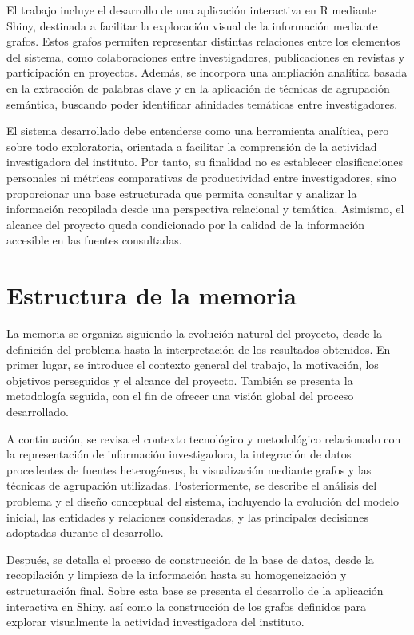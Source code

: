 \documentclass[11pt,spanish,listoffigures,listoftables]{tfgetsinf}
\begin{document}
El trabajo incluye el desarrollo de una aplicación interactiva en R mediante Shiny, destinada a facilitar la exploración visual de la información mediante grafos. Estos grafos permiten representar distintas relaciones entre los elementos del sistema, como colaboraciones entre investigadores, publicaciones en revistas y participación en proyectos. Además, se incorpora una ampliación analítica basada en la extracción de palabras clave y en la aplicación de técnicas de agrupación semántica, buscando poder identificar afinidades temáticas entre investigadores.

El sistema desarrollado debe entenderse como una herramienta analítica, pero sobre todo exploratoria, orientada a facilitar la comprensión de la actividad investigadora del instituto. Por tanto, su finalidad no es establecer clasificaciones personales ni métricas comparativas de productividad entre investigadores, sino proporcionar una base estructurada que permita consultar y analizar la información recopilada desde una perspectiva relacional y temática. Asimismo, el alcance del proyecto queda condicionado por la calidad de la información accesible en las fuentes consultadas.

\section{Estructura de la memoria}

La memoria se organiza siguiendo la evolución natural del proyecto, desde la definición del problema hasta la interpretación de los resultados obtenidos. En primer lugar, se introduce el contexto general del trabajo, la motivación, los objetivos perseguidos y el alcance del proyecto. También se presenta la metodología seguida, con el fin de ofrecer una visión global del proceso desarrollado.

A continuación, se revisa el contexto tecnológico y metodológico relacionado con la representación de información investigadora, la integración de datos procedentes de fuentes heterogéneas, la visualización mediante grafos y las técnicas de agrupación utilizadas. Posteriormente, se describe el análisis del problema y el diseño conceptual del sistema, incluyendo la evolución del modelo inicial, las entidades y relaciones consideradas, y las principales decisiones adoptadas durante el desarrollo.

Después, se detalla el proceso de construcción de la base de datos, desde la recopilación y limpieza de la información hasta su homogeneización y estructuración final. Sobre esta base se presenta el desarrollo de la aplicación interactiva en Shiny, así como la construcción de los grafos definidos para explorar visualmente la actividad investigadora del instituto.
\end{document}
